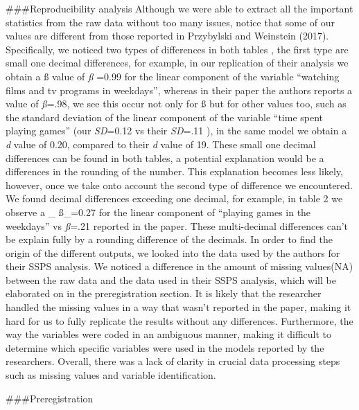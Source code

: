 \documentclass[man]{apa6}
\theoremstyle{definition}
\theoremstyle{definition}
\theoremstyle{definition}
\theoremstyle{remark}
\begin{document}
\#\#\#Reproducibility analysis Although we were able to extract all the
important statistics from the raw data without too many issues, notice
that some of our values are different from those reported in Przybylski
and Weinstein (2017). Specifically, we noticed two types of differences
in both tables , the first type are small one decimal differences, for
example, in our replication of their analysis we obtain a ß value of
\emph{ß} =0.99 for the linear component of the variable
\enquote{watching films and tv programs in weekdays}, whereas in their
paper the authors reports a value of \emph{ß}=.98, we see this occur not
only for ß but for other values too, such as the standard deviation of
the linear component of the variable \enquote{time spent playing games}
(our \emph{SD}=0.12 vs their \emph{SD}=.11 ), in the same model we
obtain a \emph{\textbar{}d\textbar{}} value of 0.20, compared to their
\emph{\textbar{}d\textbar{}} value of 19. These small one decimal
differences can be found in both tables, a potential explanation would
be a differences in the rounding of the number. This explanation becomes
less likely, however, once we take onto account the second type of
difference we encountered. We found decimal differences exceeding one
decimal, for example, in table 2 we observe a \_ ß\_=0.27 for the linear
component of \enquote{playing games in the weekdays} vs \emph{ß}=.21
reported in the paper. These multi-decimal differences can't be explain
fully by a rounding difference of the decimals. In order to find the
origin of the different outputs, we looked into the data used by the
authors for their SSPS analysis. We noticed a difference in the amount
of missing values(NA) between the raw data and the data used in their
SSPS analysis, which will be elaborated on in the preregistration
section. It is likely that the researcher handled the missing values in
a way that wasn't reported in the paper, making it hard for us to fully
replicate the results without any differences. Furthermore, the way the
variables were coded in an ambiguous manner, making it difficult to
determine which specific variables were used in the models reported by
the researchers. Overall, there was a lack of clarity in crucial data
processing steps such as missing values and variable identification.

\#\#\#Preregistration
\end{document}
